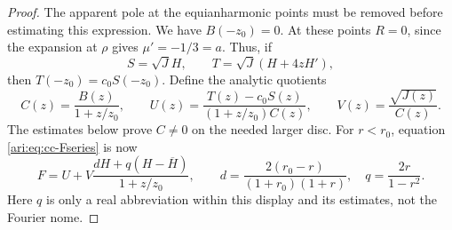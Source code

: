 \begin{proof}
The apparent pole at the equianharmonic points must be removed
before estimating this expression. We have $B(-z_0)=0$.
At these points $R=0$, since the expansion at $\rho$ gives
$\mu'=-1/3=a$. Thus, if
\[
 S=\sqrt J H,\qquad T=\sqrt J(H+4zH'),
\]
then $T(-z_0)=c_0S(-z_0)$. Define the analytic quotients
\[
 C(z)=\frac{B(z)}{1+z/z_0},\qquad
 U(z)=\frac{T(z)-c_0S(z)}{(1+z/z_0)C(z)},\qquad
 V(z)=\frac{\sqrt{J(z)}}{C(z)}.
\]
The estimates below prove $C\ne0$ on the needed larger disc.
For $r<r_0$, equation \eqref{ari:eq:cc-Fseries} is now
\begin{equation}\label{ari:eq:cc-Ffactored}
 F=U+V\frac{dH+q(H-\overline H)}{1+z/z_0},
 \qquad
 d=\frac{2(r_0-r)}{(1+r_0)(1+r)},\quad q=\frac{2r}{1-r^2}.
\end{equation}
Here $q$ is only a real abbreviation within this display and
its estimates, not the Fourier nome.


\end{proof}
